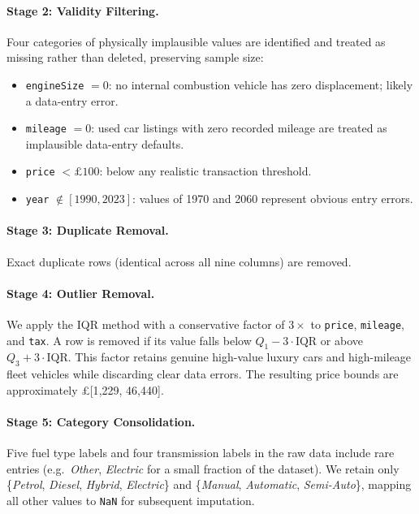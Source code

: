 \paragraph{Stage 2: Validity Filtering.}
Four categories of physically implausible values are identified and treated as missing rather than deleted, preserving sample size:
\begin{itemize}
  \item \texttt{engineSize} $= 0$: no internal combustion vehicle has zero displacement; likely a data-entry error.
  \item \texttt{mileage} $= 0$: used car listings with zero recorded mileage are treated as implausible data-entry defaults.
  \item \texttt{price} $< \pounds{}100$: below any realistic transaction threshold.
  \item \texttt{year} $\notin [1990, 2023]$: values of 1970 and 2060 represent obvious entry errors.
\end{itemize}

\paragraph{Stage 3: Duplicate Removal.}
Exact duplicate rows (identical across all nine columns) are removed.

\paragraph{Stage 4: Outlier Removal.}
We apply the IQR method with a conservative factor of $3\times$ to \texttt{price}, \texttt{mileage}, and \texttt{tax}.
A row is removed if its value falls below $Q_1 - 3 \cdot \mathrm{IQR}$ or above $Q_3 + 3 \cdot \mathrm{IQR}$.
This factor retains genuine high-value luxury cars and high-mileage fleet vehicles while discarding clear data errors.
The resulting price bounds are approximately \pounds{}[1{,}229, 46{,}440].

\paragraph{Stage 5: Category Consolidation.}
Five fuel type labels and four transmission labels in the raw data include rare entries (e.g.\ \textit{Other}, \textit{Electric} for a small fraction of the dataset).
We retain only \{\textit{Petrol}, \textit{Diesel}, \textit{Hybrid}, \textit{Electric}\} and \{\textit{Manual}, \textit{Automatic}, \textit{Semi-Auto}\}, mapping all other values to \texttt{NaN} for subsequent imputation.

